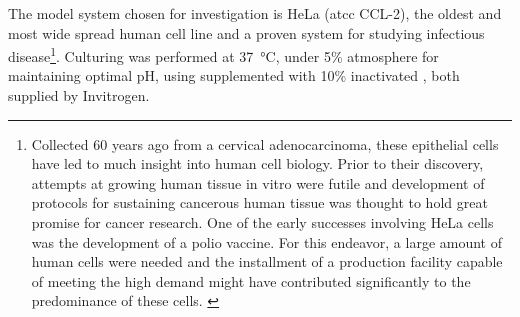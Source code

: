 The model system chosen for investigation is HeLa (\acrshort{atcc} CCL-2), the oldest and most wide spread human cell line and a proven system for studying infectious disease\footnote{Collected 60 years ago from a cervical adenocarcinoma, these epithelial cells have led to much insight into human cell biology. Prior to their discovery, attempts at growing human tissue in vitro were futile and development of protocols for sustaining cancerous human tissue was thought to hold great promise for cancer research. One of the early successes involving HeLa cells was the development of a polio vaccine. For this endeavor, a large amount of human cells were needed and the installment of a production facility capable of meeting the high demand might have contributed significantly to the predominance of these cells. \citep{Masters2002}}. Culturing was performed at \SI{37}{\celsius}, under 5\%  atmosphere for maintaining optimal pH, using   supplemented with 10\% inactivated , both supplied by Invitrogen.

